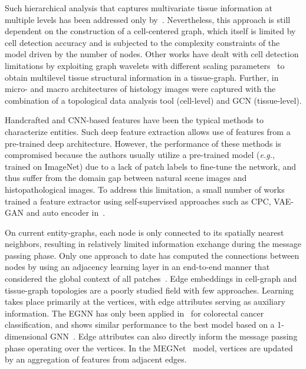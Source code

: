 Such hierarchical analysis that captures multivariate tissue information at multiple levels has been addressed only by~. 
Nevertheless, this approach is still dependent on the construction of a cell-centered graph, which itself is limited by cell detection accuracy and is subjected to the complexity constraints of the model driven by the number of nodes.
Other works have dealt with cell detection limitations by exploiting graph wavelets with different scaling parameters{~} to obtain multilevel tissue structural information in a tissue-graph. Further, in{~} micro- and macro architectures of histology images were captured with the combination of a topological data analysis tool (cell-level) and GCN (tissue-level).

Handcrafted and CNN-based features have been the typical methods to characterize entities. Such deep feature extraction allows use of features from a pre-trained deep architecture. However, the performance of these methods is compromised because the authors usually utilize a pre-trained model (\textit{e.g.}, trained on ImageNet) due to a lack of patch labels to fine-tune the network, and thus suffer from the domain gap between natural scene images and histopathological images. To address this limitation, a small number of works trained a feature extractor using self-supervised approaches such as CPC, VAE-GAN and auto encoder in~.

On current entity-graphs, each node is only connected to its spatially nearest neighbors, resulting in relatively limited information exchange during the message passing phase. Only one approach to date has computed the connections between nodes by using an adjacency learning layer in an end-to-end manner that considered the global context of all patches~.
Edge embeddings in cell-graph and tissue-graph topologies are a poorly studied field with few approaches. Learning takes place primarily at the vertices, with edge attributes serving as auxiliary information. The EGNN has only been applied in{~} for colorectal cancer classification, and shows similar performance to the best model based on a 1-dimensional GNN{~}.
Edge attributes can also directly inform the message passing phase operating over the vertices. In the MEGNet{~} model, vertices are updated by an aggregation of features from adjacent edges.

